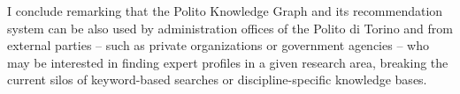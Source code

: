 \documentclass[english, 12pt]{article}
\begin{document}
I conclude remarking that the Polito Knowledge Graph and its recommendation
system can be also used by administration offices of the Polito di Torino and
from external parties -- such as private organizations or government agencies --
who may be interested in finding expert profiles in a given research
area, breaking the current silos of keyword-based searches or
discipline-specific knowledge bases.
\end{document}
